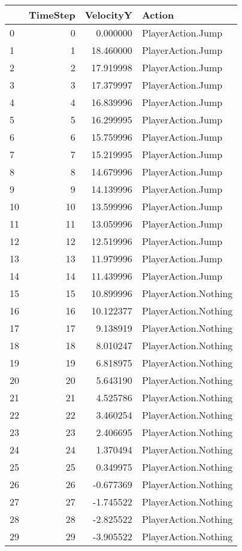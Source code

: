 \begin{tabular}{lrrl}
\toprule
 & TimeStep & VelocityY & Action \\
\midrule
0 & 0 & 0.000000 & PlayerAction.Jump \\
1 & 1 & 18.460000 & PlayerAction.Jump \\
2 & 2 & 17.919998 & PlayerAction.Jump \\
3 & 3 & 17.379997 & PlayerAction.Jump \\
4 & 4 & 16.839996 & PlayerAction.Jump \\
5 & 5 & 16.299995 & PlayerAction.Jump \\
6 & 6 & 15.759996 & PlayerAction.Jump \\
7 & 7 & 15.219995 & PlayerAction.Jump \\
8 & 8 & 14.679996 & PlayerAction.Jump \\
9 & 9 & 14.139996 & PlayerAction.Jump \\
10 & 10 & 13.599996 & PlayerAction.Jump \\
11 & 11 & 13.059996 & PlayerAction.Jump \\
12 & 12 & 12.519996 & PlayerAction.Jump \\
13 & 13 & 11.979996 & PlayerAction.Jump \\
14 & 14 & 11.439996 & PlayerAction.Jump \\
15 & 15 & 10.899996 & PlayerAction.Nothing \\
16 & 16 & 10.122377 & PlayerAction.Nothing \\
17 & 17 & 9.138919 & PlayerAction.Nothing \\
18 & 18 & 8.010247 & PlayerAction.Nothing \\
19 & 19 & 6.818975 & PlayerAction.Nothing \\
20 & 20 & 5.643190 & PlayerAction.Nothing \\
21 & 21 & 4.525786 & PlayerAction.Nothing \\
22 & 22 & 3.460254 & PlayerAction.Nothing \\
23 & 23 & 2.406695 & PlayerAction.Nothing \\
24 & 24 & 1.370494 & PlayerAction.Nothing \\
25 & 25 & 0.349975 & PlayerAction.Nothing \\
26 & 26 & -0.677369 & PlayerAction.Nothing \\
27 & 27 & -1.745522 & PlayerAction.Nothing \\
28 & 28 & -2.825522 & PlayerAction.Nothing \\
29 & 29 & -3.905522 & PlayerAction.Nothing \\

\end{tabular}
